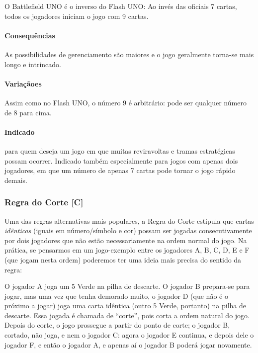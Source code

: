 O Battlefield UNO é o inverso do Flash UNO: Ao invés das oficiais 7 cartas, todos os jogadores iniciam o jogo com 9 cartas.

\paragraph{Consequências}

As possibilidades de gerenciamento são maiores e o jogo geralmente torna-se mais longo e intrincado.

\paragraph{Variaçãoes}

Assim como no Flash UNO, o número 9 é arbitrário: pode ser qualquer número de 8 para cima.

\paragraph{Indicado}

para quem deseja um jogo em que muitas reviravoltas e tramas estratégicas possam ocorrer. Indicado também especialmente para jogos com apenas dois jogadores, em que um número de apenas 7 cartas pode tornar o jogo rápido demais.

\subsubsection{Regra do Corte [C]}

Uma das regras alternativas mais populares, a Regra do Corte estipula que cartas \emph{idênticas} (iguais em número/símbolo e cor) possam ser jogadas consecutivamente por dois jogadores que não estão necessariamente na ordem normal do jogo. Na prática, se pensarmos em um jogo-exemplo entre os jogadores A, B, C, D, E e F (que jogam nesta ordem) poderemos ter uma ideia mais precisa do sentido da regra:

O jogador A joga um 5 Verde na pilha de descarte. O jogador B prepara-se para jogar, mas uma vez que tenha demorado muito, o jogador D (que não é o próximo a jogar) joga uma carta idêntica (outro 5 Verde, portanto) na pilha de descarte. Essa jogada é chamada de ``corte'', pois corta a ordem natural do jogo. Depois do corte, o jogo prossegue a partir do ponto de corte; o jogador B, cortado, não joga, e nem o jogador C: agora o jogador E continua, e depois dele o jogador F, e então o jogador A, e apenas aí o jogador B poderá jogar novamente.

